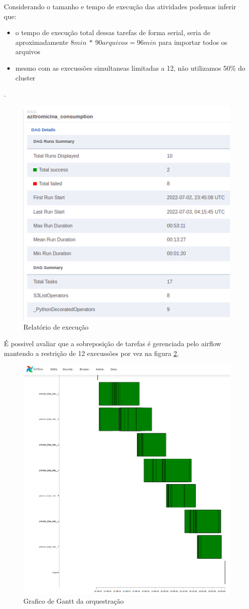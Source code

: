 Considerando o tamanho e tempo de execução das atividades podemos inferir que:
\begin{itemize}
    \item o tempo de execução total dessas tarefas de forma serial, seria de aproximadamente $8 min\ *\ 90 arquivos = 96min$ para importar todos os arquivos
    \item mesmo com as execussões simultaneas limitadas a 12, não utilizamos 50\% do cluster
\end{itemize} . 


\begin{figure}[!ht]
    \centering
    \includegraphics[width=0.5\linewidth]{04-figuras/report_execution_summary1.png}
    \caption{Relatório de execução}
    \label{fig:report}
\end{figure}

É possivel avaliar que a sobreposição de tarefas é gerenciada pelo airflow mantendo a restrição de 12 execussões por vez na figura \ref{fig:gantt},

\begin{figure}[!ht]
    \centering
    \includegraphics[width=0.7\linewidth]{04-figuras/gantt.png}
    \caption{Grafico de Gantt da orquestração}
    \label{fig:gantt}
\end{figure}

